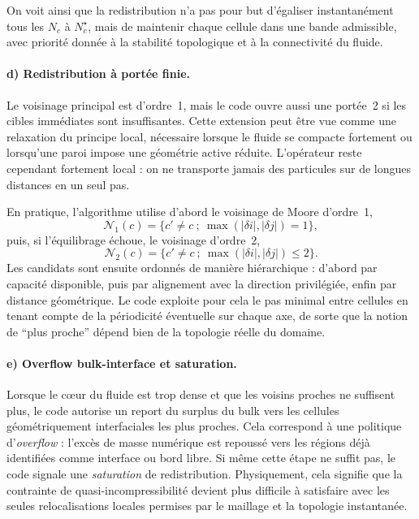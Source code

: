 \documentclass[11pt,a4paper]{article}
\begin{document}
On voit ainsi que la redistribution n'a pas pour but d'égaliser instantanément tous les $N_c$ à $N_c^{\star}$, mais de maintenir chaque cellule dans une bande admissible, avec priorité donnée à la stabilité topologique et à la connectivité du fluide.

\paragraph{d) Redistribution à portée finie.}
Le voisinage principal est d'ordre~1, mais le code ouvre aussi une portée~2 si les cibles immédiates sont insuffisantes. Cette extension peut être vue comme une relaxation du principe local, nécessaire lorsque le fluide se compacte fortement ou lorsqu'une paroi impose une géométrie active réduite. L'opérateur reste cependant fortement local : on ne transporte jamais des particules sur de longues distances en un seul pas.

En pratique, l'algorithme utilise d'abord le voisinage de Moore d'ordre~1,
\begin{equation}
  \mathcal{N}_1(c) = \{c' \neq c\ ;\ \max(|\delta i|,|\delta j|)=1\},
\end{equation}
puis, si l'équilibrage échoue, le voisinage d'ordre~2,
\begin{equation}
  \mathcal{N}_2(c) = \{c' \neq c\ ;\ \max(|\delta i|,|\delta j|)\le 2\}.
\end{equation}
Les candidats sont ensuite ordonnés de manière hiérarchique : d'abord par capacité disponible, puis par alignement avec la direction privilégiée, enfin par distance géométrique. Le code exploite pour cela le pas minimal entre cellules en tenant compte de la périodicité éventuelle sur chaque axe, de sorte que la notion de ``plus proche'' dépend bien de la topologie réelle du domaine.

\paragraph{e) Overflow bulk-interface et saturation.}
Lorsque le cœur du fluide est trop dense et que les voisins proches ne suffisent plus, le code autorise un report du surplus du bulk vers les cellules géométriquement interfaciales les plus proches. Cela correspond à une politique d'\emph{overflow} : l'excès de masse numérique est repoussé vers les régions déjà identifiées comme interface ou bord libre. Si même cette étape ne suffit pas, le code signale une \emph{saturation} de redistribution. Physiquement, cela signifie que la contrainte de quasi-incompressibilité devient plus difficile à satisfaire avec les seules relocalisations locales permises par le maillage et la topologie instantanée.
\end{document}
